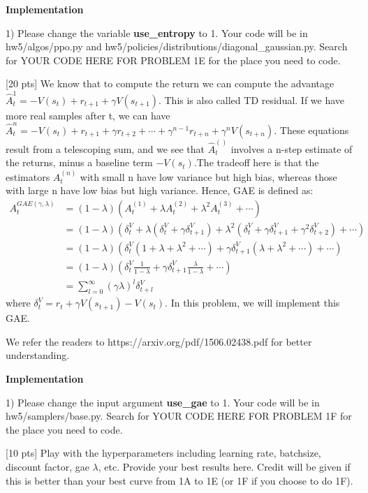 \documentclass{article}
\begin{document}
 {\bf Implementation} 
 
 1) Please change the variable {\bf use\_entropy} to 1. Your code will be in hw5/algos/ppo.py and hw5/policies/distributions/diagonal\_gaussian.py. Search for YOUR CODE HERE FOR PROBLEM 1E for the place you need to code.
 
\vskip 0.5in
  [20 pts]  We know that to compute the return we can compute the advantage $\hat{A}_t^{1}=-V(s_{t})+r_{t+1}+\gamma V(s_{t+1})$. This is also called TD residual. If we have more real samples after t, we can have $\hat{A}_t^{n}=-V(s_{t}) + r_{t+1}+\gamma r_{t+2}+\cdots+\gamma^{n-1}r_{t+n}+\gamma^{n}V(s_{t+n}). $  These equations result from a telescoping sum, and we see that $\hat{A}^()_t$ involves a n-step estimate of the returns, minus a baseline term $−V(s_t)$.The tradeoff here is that the estimators $A^(n)_t$ with small n have low variance but high bias, whereas those with large n have low bias but high variance. Hence, GAE is defined as:
 \begin{align}
 A^{GAE(\gamma,\lambda)}_t &=(1-\lambda)(A^{(1)}_t+\lambda A^{(2)}_t+\lambda^2 A^{(3)}_t+\cdots) \\
 &=(1-\lambda)(\delta^V_t+\lambda(\delta^V_t+\gamma \delta^V_{t+1})+\lambda^2(\delta^V_t+\gamma \delta^V_{t+1}+\gamma^2 \delta^V_{t+2})+ \cdots) \\
 &=(1-\lambda)(\delta^V_t(1+\lambda+\lambda^2 + \cdots)+\gamma \delta^V_{t+1}(\lambda+\lambda^2+\cdots)+\cdots) \\
 &=(1-\lambda)(\delta^V_t \frac{1}{1 - \lambda} + \gamma \delta^V_{t+1}\frac{\lambda}{1-\lambda}+ \cdots ) \\
 &=\sum_{l=0}^{\infty}(\gamma \lambda)^l \delta^V_{t+l}
 \end{align}
 where $\delta^V_t=r_t+\gamma V(s_{t+1})−V(s_t)$. In this problem, we will implement this GAE. 
 
 We refer the readers to https://arxiv.org/pdf/1506.02438.pdf for better understanding.
 
 {\bf Implementation} 
 
 1) Please change the input argument {\bf use\_gae} to 1. Your code will be in hw5/samplers/base.py. Search for YOUR CODE HERE FOR PROBLEM 1F for the place you need to code.

\vskip 0.5in
 [10 pts]  Play with the hyperparameters including learning rate, batchsize, discount factor, gae $\lambda$, etc. Provide your best results here. Credit will be given if this is better than your best curve from 1A to 1E (or 1F if you choose to do 1F).
\end{document}

